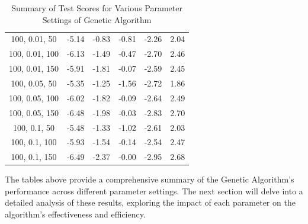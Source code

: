 \documentclass[
]{article}
\begin{document}
\begin{table}[H]
{\begin{tabular}{|c|c|c|c|c|c|}
                100, 0.01, 50              & -5.14                      & -0.83                      & -0.81                      & -2.26                    & 2.04                    \\
                100, 0.01, 100             & -6.13                      & -1.49                      & -0.47                      & -2.70                    & 2.46                    \\
                100, 0.01, 150             & -5.91                      & -1.81                      & -0.07                      & -2.59                    & 2.45                    \\
                100, 0.05, 50              & -5.35                      & -1.25                      & -1.56                      & -2.72                    & 1.86                    \\
                100, 0.05, 100             & -6.02                      & -1.82                      & -0.09                      & -2.64                    & 2.49                    \\
                100, 0.05, 150             & -6.48                      & -1.98                      & -0.03                      & -2.83                    & 2.70                    \\
                100, 0.1, 50               & -5.48                      & -1.33                      & -1.02                      & -2.61                    & 2.03                    \\
                100, 0.1, 100              & -5.93                      & -1.54                      & -0.14                      & -2.54                    & 2.47                    \\
                100, 0.1, 150              & -6.49                      & -2.37                      & -0.00                      & -2.95                    & 2.68                    \\
                \hline
            \end{tabular}
        }
        \caption{Summary of Test Scores for Various Parameter Settings of Genetic Algorithm}
        \label{tab:ga_summary_test_scores}
    \end{table}


    The tables above provide a comprehensive summary of the Genetic Algorithm's performance across different parameter settings. The next section will delve into a detailed analysis of these results, exploring the impact of each parameter on the algorithm's effectiveness and efficiency.
\end{document}
